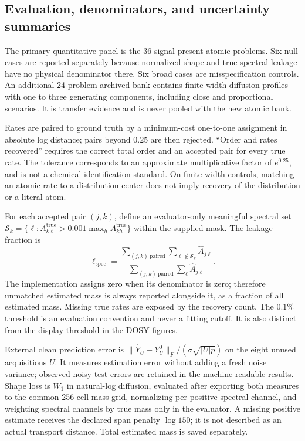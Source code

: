 \subsection{Evaluation, denominators, and uncertainty summaries}
The primary quantitative panel is the 36 signal-present atomic problems. Six null cases are reported separately because normalized shape and true spectral leakage have no physical denominator there. Six broad cases are misspecification controls. An additional 24-problem archived bank contains finite-width diffusion profiles with one to three generating components, including close and proportional scenarios. It is transfer evidence and is never pooled with the new atomic bank.

Rates are paired to ground truth by a minimum-cost one-to-one assignment in absolute log distance; pairs beyond $0.25$ are then rejected. ``Order and rates recovered'' requires the correct total order and an accepted pair for every true rate. The tolerance corresponds to an approximate multiplicative factor of $e^{0.25}$, and is not a chemical identification standard. On finite-width controls, matching an atomic rate to a distribution center does not imply recovery of the distribution or a literal atom.

For each accepted pair $(j,k)$, define an evaluator-only meaningful spectral set
$\mathcal S_k=\{\ell:A^{\mathrm{true}}_{k\ell}>0.001\max_h A^{\mathrm{true}}_{kh}\}$ within the supplied mask. The leakage fraction is
\begin{equation}\label{eq:leakage}
 \ell_{\mathrm{spec}}=
 \frac{\sum_{(j,k)\ \mathrm{paired}}\sum_{\ell\notin\mathcal S_k}\widehat A_{j\ell}}
 {\sum_{(j,k)\ \mathrm{paired}}\sum_\ell\widehat A_{j\ell}}.
\end{equation}
The implementation assigns zero when its denominator is zero; therefore unmatched estimated mass is always reported alongside it, as a fraction of all estimated mass. Missing true rates are exposed by the recovery count. The $0.1\%$ threshold is an evaluation convention and never a fitting cutoff. It is also distinct from the display threshold in the DOSY figures.

External clean prediction error is $\|\widehat Y_U-Y_U^0\|_F/(\sigma\sqrt{|U|p})$ on the eight unused acquisitions $U$. It measures estimation error without adding a fresh noise variance; observed noisy-test errors are retained in the machine-readable results. Shape loss is $W_1$ in natural-log diffusion, evaluated after exporting both measures to the common 256-cell mass grid, normalizing per positive spectral channel, and weighting spectral channels by true mass only in the evaluator. A missing positive estimate receives the declared span penalty $\log150$; it is not described as an actual transport distance. Total estimated mass is saved separately.


